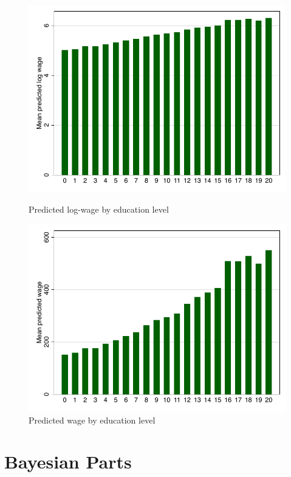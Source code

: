 \documentclass{article}
\begin{document}
\begin{figure}
\centering
  \begin{minipage}[b]{0.48\textwidth}
    \includegraphics[width=\textwidth]{../Figures/logwage_ols.pdf}
    \caption{Predicted log-wage by education level}
    \label{fig:1}
  \end{minipage}
  \begin{minipage}[b]{0.48\textwidth}
    \includegraphics[width=\textwidth]{../Figures/wage_ols.pdf}
    \caption{Predicted wage by education level}
    \label{fig:2}
  \end{minipage}
\end{figure}

\section*{Bayesian Parts}
\end{document}
